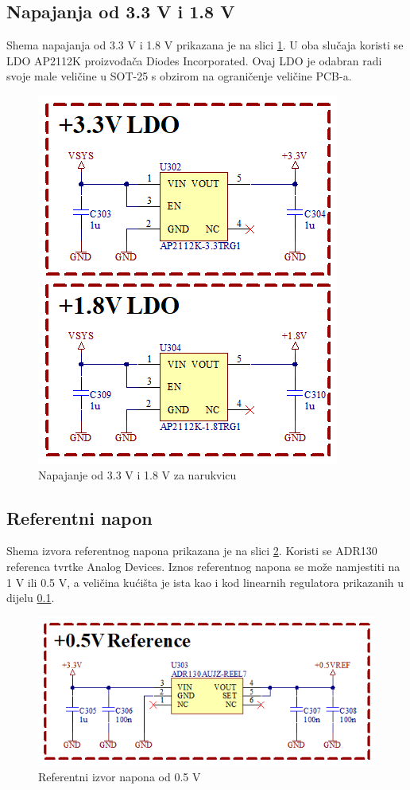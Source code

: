 \subsection{Napajanja od 3.3 V i 1.8 V}
\label{subsec:BR_VDD}
Shema napajanja od 3.3 V i 1.8 V prikazana je na slici \ref{slk:BR_VDD}. U oba slučaja koristi se LDO AP2112K proizvođača Diodes Incorporated. Ovaj LDO je odabran radi svoje male veličine u SOT-25 s obzirom na ograničenje veličine PCB-a.
\begin{figure}[htb]
    \centering
    \includegraphics[width=6 cm]{Figures/BR_VDD.png}
    \caption{Napajanje od 3.3 V i 1.8 V za narukvicu}
    \label{slk:BR_VDD}
\end{figure}

\subsection{Referentni napon}

Shema izvora referentnog napona prikazana je na slici \ref{slk:BR_VREF}. Koristi se ADR130 referenca tvrtke Analog Devices. Iznos referentnog napona se može namjestiti na 1 V ili 0.5 V, a veličina kućišta je ista kao i kod linearnih regulatora prikazanih u dijelu \ref{subsec:BR_VDD}.
\begin{figure}[htb]
    \centering
    \includegraphics[width=10 cm]{Figures/BR_VREF.png}
    \caption{Referentni izvor napona od 0.5 V}
    \label{slk:BR_VREF}
\end{figure}

